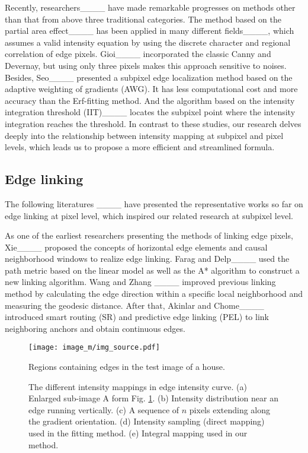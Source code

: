 Recently, researchers____ have made remarkable progresses on methods other than that from above three traditional categories.
The method based on the partial area effect____ has been applied in many different fields____, which assumes a valid intensity equation by using the discrete character and regional correlation of edge pixels.
Gioi____ incorporated the classic Canny and Devernay, but using only three pixels makes this approach sensitive to noises. Besides, Seo____ presented a subpixel edge localization method based on the adaptive weighting of gradients (AWG). It has less computational cost and more accuracy than the Erf-fitting method.
And the algorithm based on the intensity integration threshold (IIT)____ locates the subpixel point where the intensity integration reaches the threshold. 
In contrast to these studies, our research delves deeply into the relationship between intensity mapping at subpixel and pixel levels, which leads us to propose a more efficient and streamlined formula.

\subsection{Edge linking}
The following literatures ____ have presented the representative works so far on edge linking at pixel level, which inspired our related research at subpixel level.

As one of the earliest researchers presenting the methods of linking edge pixels, Xie____ proposed the concepts of horizontal edge elements and causal neighborhood windows to realize edge linking. 
Farag and Delp____ used the path metric based on the linear model as well as the A* algorithm to construct a new linking algorithm. Wang and Zhang ____ improved previous linking method by calculating the edge direction within a specific local neighborhood and measuring the geodesic distance. After that, Akinlar and Chome____ introduced smart routing (SR) and predictive edge linking (PEL) to link neighboring anchors and obtain continuous edges.

\begin{figure}[t]
    \centering
    \texttt{[image: image\_m/img\_source.pdf]} 
    \caption{Regions containing edges in the test image of a house.}
    \label{fig_s}
\end {figure}

\begin{figure}[h]
   \centering
    \caption{The different intensity mappings in edge intensity curve. (a) Enlarged sub-image A form Fig. \ref{fig_s}. (b) Intensity distribution near an edge running vertically. (c) A sequence of $n$ pixels extending along the gradient orientation. 
    (d) Intensity sampling (direct mapping) used in the fitting method. (e) Integral mapping used in our method.}  
    \label{fig5}
\end{figure}

